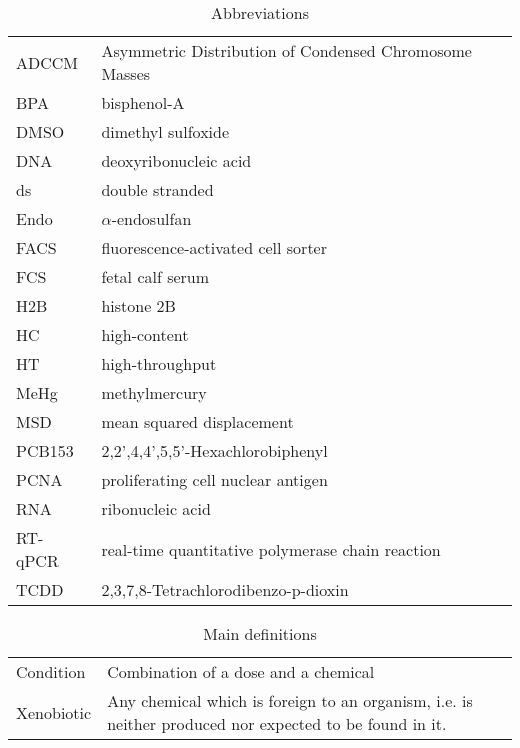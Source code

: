 \documentclass[11pt, oneside]{Thesis} %
\begin{document}
\clearpage %
\begin{table}
\caption{Abbreviations}
\begin{tabular}{ll}
ADCCM &Asymmetric Distribution of Condensed Chromosome Masses\\
BPA & bisphenol-A \\
DMSO & dimethyl sulfoxide\\
DNA & deoxyribonucleic acid\\
ds & double stranded \\
Endo & $\alpha$-endosulfan \\
FACS & fluorescence-activated cell sorter\\
FCS & fetal calf serum\\
H2B & histone 2B\\
HC & high-content\\
HT & high-throughput\\
MeHg & methylmercury\\
MSD & mean squared displacement\\
PCB153 & 2,2',4,4',5,5'-Hexachlorobiphenyl\\
PCNA & proliferating cell nuclear antigen\\
RNA & ribonucleic acid\\
RT-qPCR & real-time quantitative polymerase chain reaction\\
TCDD & 2,3,7,8-Tetrachlorodibenzo-p-dioxin\\
\end{tabular}
\end{table}
\begin{table}
\caption{Main definitions}
\begin{tabular}{lL{10cm}}
Condition & Combination of a dose and a chemical\\
Xenobiotic & Any chemical which is foreign to an organism, i.e. is neither produced nor expected to be found in it.
\end{tabular}
\end{table}
\clearpage %



\pagestyle{empty} %
\end{document}
